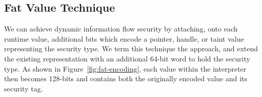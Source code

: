 
\begin{comment}
         *     False:     0x06 =     4 + 2
         *     True:      0x07 =     4 + 2 + 1
         *     Undefined: 0x0a = 8     + 2
         *     Null:      0x02 =         2

         * These values have the following properties:
         * - Bit 1 (TagBitTypeOther) is set for all four values, allowing real pointers to be
         *   quickly distinguished from all immediate values, including these invalid pointers.
         * - With bit 3 is masked out (TagBitUndefined) Undefined and Null share the
         *   same value, allowing null & undefined to be quickly detected.
         *
         *     Deleted:   0x0
         *     Empty:   0x4
         * No valid JSValue will have the bit pattern 0x0, this is used to represent array
         * holes, and as a C++ 'no value' result (e.g. JSValue() has an internal value of 0).
        // These special values are never visible to JavaScript code; Empty is used to represent
        // Array holes, and for uninitialized JSValues. Deleted is used in hash table code.
        // These values would map to cell types in the JSValue encoding, but not valid GC cell
        // pointer should have either of these values (Empty is null, deleted is at an invalid
        // alignment for a GC cell, and in the zero page).
         */
\end{comment}

\subsection{Fat Value Technique}\label{sec:fat-values}
We can achieve dynamic information flow security by attaching, onto each runtime value, additional bits which encode a pointer, handle, or taint value representing the security type.
We term this technique the  approach, and extend the existing  representation with an additional 64-bit word to hold the security type.
As shown in Figure~\ref{fig:fat-encoding}, each value within the interpreter then becomes 128-bits and contains both the originally encoded value and its security tag.

